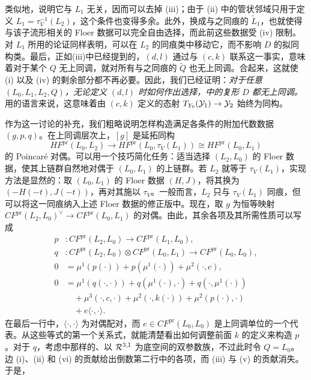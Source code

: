 类似地，说明它与 $L_1$ 无关，因而可以去掉 (iii)；由于 (ii) 中的管状邻域只用于定义 $L_1=\tau_V^{-1}(L_2)$，这个条件也变得多余。此外，换成与之同痕的 $\widetilde L_1$，也就使得与该子流形相关的 Floer 数据可以完全自由选择，而此前这些数据受 (iv) 限制。对 $L_1$ 所用的论证同样表明，可以在 $L_2$ 的同痕类中移动它，而不影响 $D$ 的拟同构类。最后，正如(iii)中已经提到的，$(d,l)$ 通过与 $(c,k)$ 联系这一事实，意味着对于某个 $Q$ 无上同调，就对所有与之同痕的 $\widetilde Q$ 也无上同调。合起来，这就使 (i) 以及 (iv) 的剩余部分都不再必要。因此，我们已经证明：\emph{对于任意 $(L_0,L_1,L_2,Q)$，无论定义 $(d,l)$ 时如何作出选择，中的复形 $D$ 都无上同调。}用的语言来说，这意味着由 $(c,k)$ 定义的态射 $T_{Y_0}(\mathcal Y_1)\to\mathcal Y_2$ 始终为同构。

\begin{note}\label{st:17.13}
作为这一讨论的补充，我们粗略说明怎样构造满足各条件的附加代数数据 $(g,p,q)$。在上同调层次上，$[g]$ 是延拓同构
\[
HF^{\mathrm{pr}}(L_0,L_2)\longrightarrow HF^{\mathrm{pr}}(L_0,\tau_V(L_1))\cong HF^{\mathrm{pr}}(L_0,L_1)
\]
的 Poincaré 对偶。可以用一个技巧简化任务：适当选择 $(L_2,L_0)$ 的 Floer 数据，使其上链群自然地对偶于 $(L_0,L_1)$ 的上链群。若 $L_2$ 就等于 $\tau_V(L_1)$，实现方法是显然的：取 $(L_0,L_1)$ 的 Floer 数据 $(H,J)$，将其换为 $(-H(-t),J(-t))$，再对其施以 $\tau_V$。一般而言，$L_2$ 只与 $\tau_V(L_1)$ 同痕，但可以将这一同痕纳入上述 Floer 数据的修正版中。现在，取 $g$ 为恒等映射 $CF^{\mathrm{pr}}(L_2,L_0)^\vee\to CF^{\mathrm{pr}}(L_0,L_1)$ 的对偶。由此，其余各项及其所需性质可以写成
\begin{equation}\label{eq:17.21}
\boxed{\begin{aligned}
p &:CF^{\mathrm{pr}}(L_2,L_0)\longrightarrow CF^{\mathrm{pr}}(L_1,L_0),\\
q &:CF^{\mathrm{pr}}(L_2,L_0)\otimes CF^{\mathrm{pr}}(L_0,L_1)\longrightarrow CF^{\mathrm{pr}}(L_0,L_0),\\
0&=\mu^1(p(\cdot))+p(\mu^1(\cdot))+\mu^2(\cdot,c),\\
0&=\mu^1(q(\cdot,\cdot))+q(\mu^1(\cdot),\cdot)+q(\cdot,\mu^1(\cdot))\\
 &\quad+\mu^3(\cdot,c,\cdot)+\mu^2(\cdot,k(\cdot))+\mu^2(p(\cdot),\cdot)\\
 &\quad+e\langle\cdot,\cdot\rangle.
\end{aligned}}
\end{equation}
在最后一行中，$\langle\cdot,\cdot\rangle$ 为对偶配对，而 $e\in CF^{\mathrm{pr}}(L_0,L_0)$ 是上同调单位的一个代表。从这些等式的第一个关系式，就能清楚看出如何调整前面 $k$ 的定义来构造 $p$。对于 $q$，考虑中那样的、以 $\mathcal R^{3,1}$ 为底空间的双参数族，不过此时令 $Q=L_0$。边 (i)、(ii) 和 (vi) 的贡献给出倒数第二行中的各项，而 (iii) 与 (v) 的贡献消失。于是，

\end{note}
